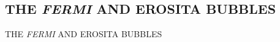 \begin{parttwoen}
\chapter{THE \textit{FERMI} AND EROSITA BUBBLES}
{\huge THE \textit{FERMI} AND EROSITA BUBBLES}
\end{parttwoen}
